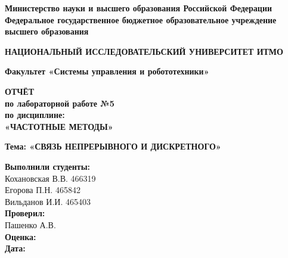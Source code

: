 \documentclass[a4paper, 12pt]{article}
\begin{document}
\begin{titlepage}
    \begin{center}
        \textbf{Министерство науки и высшего образования Российской Федерации} \\
        \textbf{Федеральное государственное бюджетное образовательное учреждение \\ высшего образования}
        \vspace{0.25cm}
        
        \textbf{НАЦИОНАЛЬНЫЙ ИССЛЕДОВАТЕЛЬСКИЙ УНИВЕРСИТЕТ ИТМО}
        \vspace{0.5cm}
        
        \textbf{Факультет «Системы управления и робототехники»} \\
        \vspace{2cm}
    \end{center}
    
    \begin{center}
        \large \textbf{ОТЧЁТ} \\
        \large \textbf{по лабораторной работе №5} \\
        \large \textbf{по дисциплине:} \\
        \Large \textbf{«ЧАСТОТНЫЕ МЕТОДЫ»} \\
        \vspace{0.7cm}
        
        \large \textbf{Тема: «СВЯЗЬ НЕПРЕРЫВНОГО И ДИСКРЕТНОГО»} \\
        \vspace{2cm}
    \end{center}
    
    \begin{flushright}
        \begin{minipage}{0.45\textwidth} %
            \textbf{Выполнили студенты:} \\
            Кохановская В.В. 466319\\ %
            Егорова П.Н. 465842\\ %
            Вильданов И.И. 465403\\ %
            \textbf{Проверил:} \\
            Пашенко А.В. \\ %
            \textbf{Оценка:} \underline{\hspace{2cm}} \\
            \textbf{Дата:} \underline{\hspace{2cm}} \\
        \end{minipage}
    \end{flushright}
    

\end{titlepage}
\end{document}
